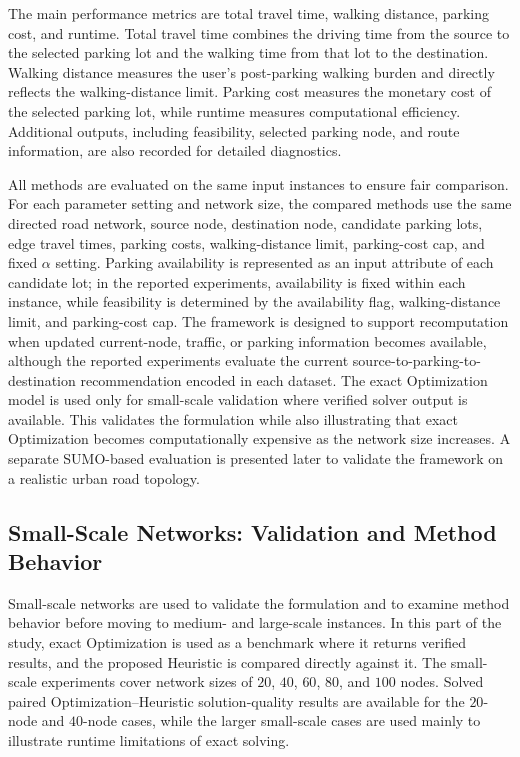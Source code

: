 The main performance metrics are total travel time, walking distance, parking cost, and runtime. Total travel time combines the driving time from the source to the selected parking lot and the walking time from that lot to the destination. Walking distance measures the user's post-parking walking burden and directly reflects the walking-distance limit. Parking cost measures the monetary cost of the selected parking lot, while runtime measures computational efficiency. Additional outputs, including feasibility, selected parking node, and route information, are also recorded for detailed diagnostics.

All methods are evaluated on the same input instances to ensure fair comparison. For each parameter setting and network size, the compared methods use the same directed road network, source node, destination node, candidate parking lots, edge travel times, parking costs, walking-distance limit, parking-cost cap, and fixed \(\alpha\) setting. Parking availability is represented as an input attribute of each candidate lot; in the reported experiments, availability is fixed within each instance, while feasibility is determined by the availability flag, walking-distance limit, and parking-cost cap. The framework is designed to support recomputation when updated current-node, traffic, or parking information becomes available, although the reported experiments evaluate the current source-to-parking-to-destination recommendation encoded in each dataset. The exact Optimization model is used only for small-scale validation where verified solver output is available. This validates the formulation while also illustrating that exact Optimization becomes computationally expensive as the network size increases. A separate SUMO-based evaluation is presented later to validate the framework on a realistic urban road topology.

\subsection{Small-Scale Networks: Validation and Method Behavior}

Small-scale networks are used to validate the formulation and to examine method behavior before moving to medium- and large-scale instances. In this part of the study, exact Optimization is used as a benchmark where it returns verified results, and the proposed Heuristic is compared directly against it. The small-scale experiments cover network sizes of \(20\), \(40\), \(60\), \(80\), and \(100\) nodes. Solved paired Optimization--Heuristic solution-quality results are available for the \(20\)-node and \(40\)-node cases, while the larger small-scale cases are used mainly to illustrate runtime limitations of exact solving.

